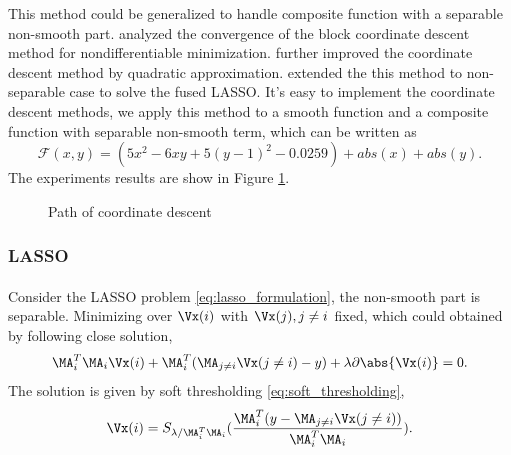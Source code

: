 \documentclass[
10pt, %
a4paper, %
oneside, %
headinclude,footinclude, %
BCOR5mm, %
]{scrartcl}
\begin{document}
This method could be generalized to handle 
composite function with a separable non-smooth part.
\citet{tseng2001convergence} analyzed the convergence of the block coordinate 
descent method for nondifferentiable minimization. \citet{tseng2009coordinate} 
further improved the coordinate descent method by quadratic approximation. 
\citet{friedman2007pathwise} extended the this method to non-separable case to 
solve the fused LASSO. It's easy to implement the coordinate descent methods, 
we apply this method to a smooth function and a composite function with 
separable non-smooth term, which can be written as
\begin{equation*}
    \mathcal{F}(x,y) = (5x^2 - 6xy + 5(y-1)^2 - 0.0259) + abs(x) + abs(y).
\end{equation*}
The experiments results are show in Figure
\ref{fig:scg}.
\begin{figure}[H]
\centering
    \hfill
\caption{Path of coordinate descent}
\label{fig:scg}
\end{figure}


\subsubsection{LASSO} 
\paragraph{} 
Consider the LASSO problem \eqref{eq:lasso_formulation}, the non-smooth 
part is separable. Minimizing over $\Vx(i)$ with $\Vx(j), j \neq i$ fixed, 
which could obtained by following close solution,
\begin{align*}
	\MA_i^T\MA_i\Vx(i) + \MA_i^T(\MA_{j\neq i}\Vx(j \neq i) - y) + \lambda 
	\partial \abs{\Vx(i)} = 0.
\end{align*}
The solution is given by soft thresholding \eqref{eq:soft_thresholding}, 
\begin{equation*}
	\Vx(i) = S_{\lambda / \MA_i^T \MA_i}
	(\frac{\MA_i^T(y - \MA_{j\neq i}\Vx(j \neq i))}{\MA_i^T \MA_i}). 
\end{equation*}
\end{document}
